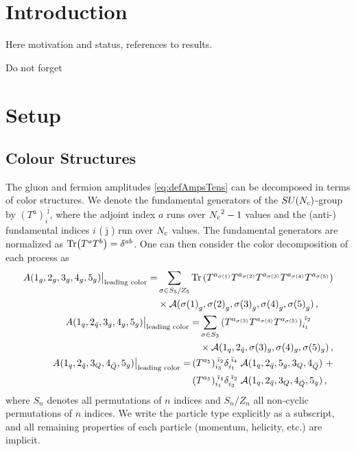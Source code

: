 \section{Introduction}
Here motivation and status, references to results.

Do not forget 

\section{Setup}

\subsection{Colour Structures}
The gluon and fermion amplitudes \eqref{eq:defAmpsTens}
can be decomposed 
in terms of color structures. 
We denote the fundamental generators of the
$SU({N_c})$-group by $(T^a)^{\;\bar{\jmath}}_{i}$, where the
adjoint index $a$ runs over ${N_c}^2-1$ values and the 
(anti-) fundamental indices $i$  ($\bar \jmath$)
run over ${N_c}$ values. The fundamental generators are normalized
as $ \Tr(T^a T^b) = \delta^{ab}$. One can then consider the color decomposition of
each process as
%
\begin{align}
  \begin{split}
    \label{eq:ColorDecG}
    A(1_g, 2_g, 3_g, 4_g, 5_g) \big\vert_{\textrm{leading color}} = &
    \sum_{\sigma\in S_5/Z_5} \Tr\left(
    T^{a_{\sigma(1)}} T^{a_{\sigma(2)}} 
    T^{a_{\sigma(3)}} T^{a_{\sigma(4)}} T^{a_{\sigma(5)}} \right)\\
    &\times \mathcal{A}({\sigma(1)}_g, {\sigma(2)}_g, {\sigma(3)}_g, {\sigma(4)}_g, {\sigma(5)}_g)\,, 
  \end{split} \\
  \begin{split}
    \label{eq:ColorDec2Q}
    A(1_q, 2_{\bar{q}}, 3_g, 4_g, 5_g) \big\vert_{\textrm{leading color}} 
    = & \sum_{\sigma\in S_3} 
    \left( T^{a_{\sigma(3)}} T^{a_{\sigma(4)}} T^{a_{\sigma(5)}} \right)^{\;\bar{\imath}_2}_{i_1} \\
    & \times\mathcal{A}(1_q,2_{\bar{q}},\sigma(3)_g,\sigma(4)_g,\sigma(5)_g)\,,
  \end{split}\\
  \begin{split}
    \label{eq:ColorDec4Q}
    A(1_q, 2_{\bar{q}}, 3_Q, 4_{\bar{Q}}, 5_g)
    \big\vert_{\textrm{leading color}} 
    = & 
    \,(T^{a_5})^{\;\bar{\imath}_{2}}_{i_{3}} \delta^{\;\bar{\imath}_{4}}_{i_{1}}\;
    \mathcal{A}(1_{q}, 2_{\bar{q}}, 5_g, 3_{Q}, 4_{\bar{Q}}) \,\,+  \\
    & \,(T^{a_5})^{\;\bar{\imath}_{4}}_{i_{1}} \delta^{\;\bar{\imath}_{2}}_{i_{3}}\;
    \mathcal{A}(1_{q},2_{\bar{q}},3_{Q},4_{\bar{Q}},5_g) \,,
  \end{split}
\end{align}
where $S_n$ denotes all permutations of $n$ indices and 
$S_n/Z_n$ all non-cyclic permutations of $n$ indices. 
We write the particle type explicitly as a subscript, and all
remaining properties of each particle (momentum, helicity, 
etc.) are implicit. 

